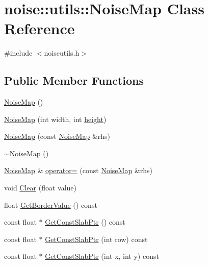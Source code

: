 \hypertarget{classnoise_1_1utils_1_1_noise_map}{\section{noise\+:\+:utils\+:\+:Noise\+Map Class Reference}
\label{classnoise_1_1utils_1_1_noise_map}
}


{\ttfamily \#include $<$noiseutils.\+h$>$}

\subsection*{Public Member Functions}
\begin{DoxyCompactItemize}
\item 
\hyperlink{classnoise_1_1utils_1_1_noise_map_a546a2d955da99a4f230a241ab5079a37}{Noise\+Map} ()
\item 
\hyperlink{classnoise_1_1utils_1_1_noise_map_adc1ec4ed1f225fa6505f162dfcdfc806}{Noise\+Map} (int width, int \hyperlink{_examples_2_bezier_2_app_8cpp_a48083b65ac9a863566dc3e3fff09a5b4}{height})
\item 
\hyperlink{classnoise_1_1utils_1_1_noise_map_a25cab079be64c1dc23f73f80afd91005}{Noise\+Map} (const \hyperlink{classnoise_1_1utils_1_1_noise_map}{Noise\+Map} \&rhs)
\item 
\hyperlink{classnoise_1_1utils_1_1_noise_map_ac1d23a99065a1a4ef8f37ed250b73a79}{$\sim$\+Noise\+Map} ()
\item 
\hyperlink{classnoise_1_1utils_1_1_noise_map}{Noise\+Map} \& \hyperlink{classnoise_1_1utils_1_1_noise_map_acf0851057b7765194287f95c9076b49a}{operator=} (const \hyperlink{classnoise_1_1utils_1_1_noise_map}{Noise\+Map} \&rhs)
\item 
void \hyperlink{classnoise_1_1utils_1_1_noise_map_a057a92b3b0288c15aaeb5c03d1542dc9}{Clear} (float value)
\item 
float \hyperlink{classnoise_1_1utils_1_1_noise_map_a17d169bc76ca1a221b2ff4f4a721948e}{Get\+Border\+Value} () const 
\item 
const float $\ast$ \hyperlink{classnoise_1_1utils_1_1_noise_map_a7e9fc390a2fb33ab1b1d65e072bdaeee}{Get\+Const\+Slab\+Ptr} () const 
\item 
const float $\ast$ \hyperlink{classnoise_1_1utils_1_1_noise_map_ac2ecdd8f49d7ce27d88a90de032e2852}{Get\+Const\+Slab\+Ptr} (int row) const 
\item 
const float $\ast$ \hyperlink{classnoise_1_1utils_1_1_noise_map_afa59a46d21340363c440d1a80c17b1b0}{Get\+Const\+Slab\+Ptr} (int x, int y) const 

\end{DoxyCompactItemize}
